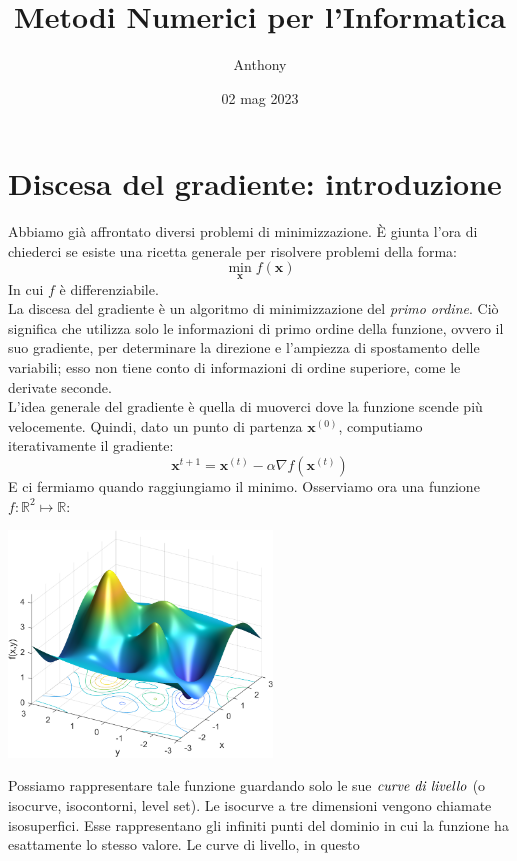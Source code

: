 \documentclass{article}
\title{Metodi Numerici per l'Informatica}
\author{Anthony}
\date{02 mag 2023}
\begin{document}
    \maketitle
    \section{Discesa del gradiente: introduzione}
        Abbiamo già affrontato diversi problemi di minimizzazione. È giunta l'ora di chiederci se esiste una 
        ricetta generale per risolvere problemi della forma:
            \[\min_\mathbf{x} f(\mathbf{x}) \]
        In cui $f$ è differenziabile. \\
        La discesa del gradiente è un algoritmo di minimizzazione del \emph{primo ordine}. Ciò significa che 
        utilizza solo le informazioni di primo ordine della funzione, ovvero il suo gradiente, per determinare 
        la direzione e l'ampiezza di spostamento delle variabili; esso non tiene conto di informazioni 
        di ordine superiore, come le derivate seconde. \\
        L'idea generale del gradiente è quella di muoverci dove la funzione scende più velocemente. Quindi, dato un 
        punto di partenza $\mathbf{x}^{(0)}$, computiamo iterativamente il gradiente:
            \[\mathbf{x}^{t+1} = \mathbf{x}^{(t)} - \alpha \nabla f(\mathbf{x}^{(t)})\]
        E ci fermiamo quando raggiungiamo il minimo. 
        Osserviamo ora una funzione $f : \mathbb{R}^2 \mapsto \mathbb{R}$:
        \begin{center}\includegraphics[width=7cm]{funr2.png}\end{center}
        Possiamo rappresentare tale funzione guardando solo le sue $\emph{curve di livello}$ (o isocurve, isocontorni, level set). Le isocurve 
        a tre dimensioni vengono chiamate isosuperfici. Esse 
        rappresentano gli infiniti punti del dominio in cui la funzione ha esattamente lo stesso valore. Le curve di livello, in questo 
\end{document}

